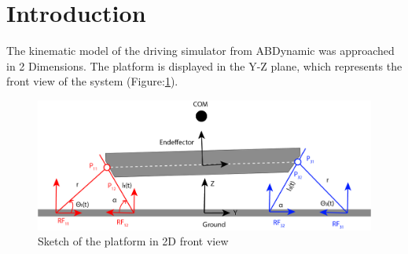 \section{Introduction}

The kinematic model of the driving simulator from ABDynamic was approached in 2 Dimensions. The platform is displayed in the Y-Z plane, which represents the front view of the system (Figure:\ref{fig:FrontView}).


\begin{figure}[h!]
  \centering
  \includegraphics[scale=0.2]{images/SystemDescription.png}
  \caption{Sketch of the platform in 2D front view \label{fig:FrontView}}
\end{figure}

